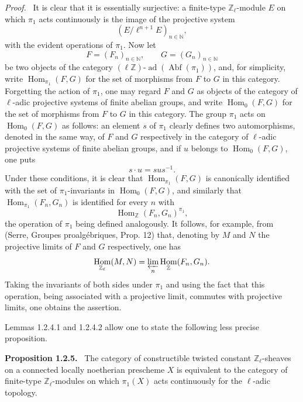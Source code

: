 \documentclass[11pt]{article}
\newenvironment{statement}[1]{\par\medskip\noindent\textbf{#1.}\ }{\par\medskip}
\newenvironment{prooftext}[1][Proof]{\par\noindent\emph{#1.}\ }{\par\medskip}
\DeclareMathOperator{\Hom}{Hom}
\providecommand{\Hom}{\operatorname{Hom}}
\providecommand{\Abf}{\operatorname{Abf}}
\providecommand{\ad}{\operatorname{ad}}
\begin{document}
\begin{prooftext}[Proof]
It is clear that it is essentially surjective: a finite-type \(\mathbb Z_\ell\)-module \(E\) on which \(\pi_1\) acts continuously is the image of the projective system
\[
(E/\ell^{n+1}E)_{n\in\mathbb N},
\]
with the evident operations of \(\pi_1\). Now let
\[
F=(F_n)_{n\in\mathbb N},\qquad G=(G_n)_{n\in\mathbb N}
\]
be two objects of the category \((\ell\mathbb Z)\text{-}\ad(\Abf(\pi_1))\), and, for simplicity, write \(\Hom_{\pi_1}(F,G)\) for the set of morphisms from \(F\) to \(G\) in this category. Forgetting the action of \(\pi_1\), one may regard \(F\) and \(G\) as objects of the category of \(\ell\)-adic projective systems of finite abelian groups, and write \(\Hom_0(F,G)\) for the set of morphisms from \(F\) to \(G\) in this category. The group \(\pi_1\) acts on \(\Hom_0(F,G)\) as follows: an element \(s\) of \(\pi_1\) clearly defines two automorphisms, denoted in the same way, of \(F\) and \(G\) respectively in the category of \(\ell\)-adic projective systems of finite abelian groups, and if \(u\) belongs to \(\Hom_0(F,G)\), one puts
\[
s\cdot u=sus^{-1}.
\]
Under these conditions, it is clear that \(\Hom_{\pi_1}(F,G)\) is canonically identified with the set of \(\pi_1\)-invariants in \(\Hom_0(F,G)\), and similarly that \(\Hom_{\pi_1}(F_n,G_n)\) is identified for every \(n\) with
\[
\Hom_{\mathbb Z}(F_n,G_n)^{\pi_1},
\]
the operation of \(\pi_1\) being defined analogously. It follows, for example, from (Serre, Groupes proalgébriques, Prop. 12) that, denoting by \(M\) and \(N\) the projective limits of \(F\) and \(G\) respectively, one has
\[
\Hom_{\mathbb Z_\ell}(M,N)=\varprojlim_n\Hom_{\mathbb Z}(F_n,G_n).
\]
Taking the invariants of both sides under \(\pi_1\) and using the fact that this operation, being associated with a projective limit, commutes with projective limits, one obtains the assertion.
\end{prooftext}

Lemmas 1.2.4.1 and 1.2.4.2 allow one to state the following less precise proposition.

\begin{statement}{Proposition 1.2.5}
The category of constructible twisted constant \(\mathbb Z_\ell\)-sheaves on a connected locally noetherian prescheme \(X\) is equivalent to the category of finite-type \(\mathbb Z_\ell\)-modules on which \(\pi_1(X)\) acts continuously for the \(\ell\)-adic topology.
\end{statement}
\end{document}
